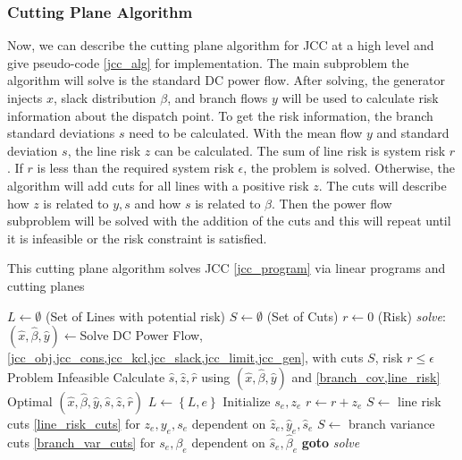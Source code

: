 \subsubsection*{Cutting Plane Algorithm}
Now, we can describe the cutting plane algorithm for JCC at a high level and give pseudo-code \ref{jcc_alg} for implementation.  The main subproblem the algorithm will solve is the standard DC power flow.  After solving, the generator injects $x$, slack distribution $\beta$, and branch flows $y$ will be used to calculate risk information about the dispatch point.  To get the risk information, the branch standard deviations $s$ need to be calculated.  With the mean flow $y$ and standard deviation $s$, the line risk $z$ can be calculated.  The sum of line risk is system risk $r$.  If $r$ is less than the required system risk $\epsilon$, the problem is solved.  Otherwise, the algorithm will add cuts for all lines with a positive risk $z$.  The cuts will describe how $z$ is related to $y,s$ and how $s$ is related to $\beta$.  Then the power flow subproblem will be solved with the addition of the cuts and this will repeat until it is infeasible or the risk constraint is satisfied.
\begin{algorithm}
\caption{This cutting plane algorithm solves JCC \ref{jcc_program} via linear programs and cutting planes}\label{jcc_alg}
\begin{algorithmic}
\State $L \gets \emptyset$  (Set of Lines with potential risk)
\State $S \gets \emptyset$  (Set of Cuts)
\State $r \gets 0$ (Risk)
\BState \emph{solve}:
\State $(\hat{x},\hat{\beta},\hat{y}) \gets $Solve DC Power Flow, \cref{jcc_obj,jcc_cons,jcc_kcl,jcc_slack,jcc_limit,jcc_gen}, with cuts $S$, risk $r\leq\epsilon$
 \Return Problem Infeasible 
\EndIf
\State Calculate $\hat{s},\hat{z},\hat{r}$ using $(\hat{x},\hat{\beta},\hat{y})$ and \cref{branch_cov,line_risk}
 \Return Optimal $(\hat{x},\hat{\beta},\hat{y},\hat{s},\hat{z},\hat{r})$
\EndIf
{}
            \State $L \gets \left\{L,e\right\}$
            \State Initialize $s_e,z_e$
            \State $r \gets r + z_e$
    \EndIf            
    \State $S \gets$ line risk cuts \ref{line_risk_cuts} for $z_e,y_e,s_e$ dependent on $\hat{z}_e,\hat{y}_e,\hat{s}_e$
    \State $S \gets$ branch variance cuts \ref{branch_var_cuts} for $s_e,\beta_e$ dependent on $\hat{s}_e,\hat{\beta}_e$
\EndIf
\EndFor
\State \textbf{goto} \emph{solve}
\EndProcedure
\end{algorithmic}
\end{algorithm}




